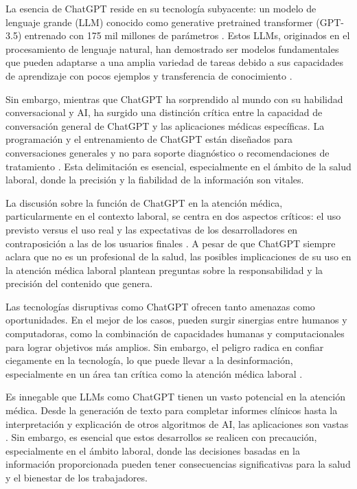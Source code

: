 La esencia de ChatGPT reside en su tecnología subyacente: un modelo de lenguaje grande (LLM) conocido como generative pretrained transformer (GPT-3.5) entrenado con 175 mil millones de parámetros \citep{Kleesiek2023AnOnly}. Estos LLMs, originados en el procesamiento de lenguaje natural, han demostrado ser modelos fundamentales que pueden adaptarse a una amplia variedad de tareas debido a sus capacidades de aprendizaje con pocos ejemplos y transferencia de conocimiento \citep{Kleesiek2023AnOnly}.

Sin embargo, mientras que ChatGPT ha sorprendido al mundo con su habilidad conversacional y AI, ha surgido una distinción crítica entre la capacidad de conversación general de ChatGPT y las aplicaciones médicas específicas. La programación y el entrenamiento de ChatGPT están diseñados para conversaciones generales y no para soporte diagnóstico o recomendaciones de tratamiento \citep{Kleesiek2023AnOnly}. Esta delimitación es esencial, especialmente en el ámbito de la salud laboral, donde la precisión y la fiabilidad de la información son vitales.

La discusión sobre la función de ChatGPT en la atención médica, particularmente en el contexto laboral, se centra en dos aspectos críticos: el uso previsto versus el uso real y las expectativas de los desarrolladores en contraposición a las de los usuarios finales \citep{Kleesiek2023AnOnly}. A pesar de que ChatGPT siempre aclara que no es un profesional de la salud, las posibles implicaciones de su uso en la atención médica laboral plantean preguntas sobre la responsabilidad y la precisión del contenido que genera.

Las tecnologías disruptivas como ChatGPT ofrecen tanto amenazas como oportunidades. En el mejor de los casos, pueden surgir sinergias entre humanos y computadoras, como la combinación de capacidades humanas y computacionales para lograr objetivos más amplios. Sin embargo, el peligro radica en confiar ciegamente en la tecnología, lo que puede llevar a la desinformación, especialmente en un área tan crítica como la atención médica laboral \citep{Kleesiek2023AnOnly}.

Es innegable que LLMs como ChatGPT tienen un vasto potencial en la atención médica. Desde la generación de texto para completar informes clínicos hasta la interpretación y explicación de otros algoritmos de AI, las aplicaciones son vastas \citep{Kleesiek2023AnOnly}. Sin embargo, es esencial que estos desarrollos se realicen con precaución, especialmente en el ámbito laboral, donde las decisiones basadas en la información proporcionada pueden tener consecuencias significativas para la salud y el bienestar de los trabajadores.


